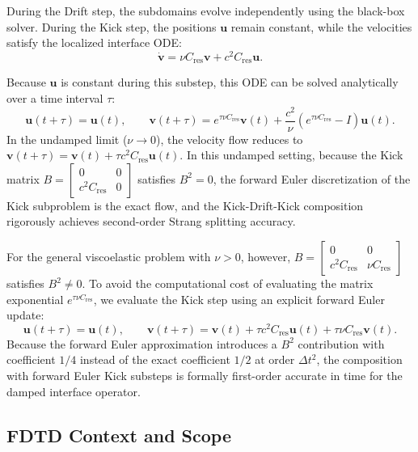 \documentclass{Configuration_Files/PoliMi3i_thesis}
\newif\ifshowthesischanges
\DeclareRobustCommand{\thesischange}[2]{%
    \ifshowthesischanges
        \textcolor{#1}{#2}%
    \else
        #2%
    \fi
}
\def\thesischange#1#2{#2}%
\begin{document}
During the Drift step, the subdomains evolve independently using the black-box solver. During the Kick step, the positions $\mathbf u$ remain constant, while the velocities satisfy the localized interface ODE:
\begin{equation*}
\mathbf{\dot v}
=
\nu C_{\mathrm{res}}\mathbf v
+
c^2C_{\mathrm{res}}\mathbf u.
\end{equation*}

\thesischange{red}{Because $\mathbf u$ is constant during this substep, this ODE can be solved analytically over a time interval $\tau$:
\begin{equation*}
\mathbf u(t+\tau) = \mathbf u(t),
\qquad
\mathbf v(t+\tau) = e^{\tau\nu C_{\mathrm{res}}}\mathbf v(t) + \frac{c^2}{\nu}\left(e^{\tau\nu C_{\mathrm{res}}} - I\right)\mathbf u(t).
\end{equation*}
In the undamped limit ($\nu \to 0$), the velocity flow reduces to $\mathbf v(t+\tau) = \mathbf v(t) + \tau c^2 C_{\mathrm{res}}\mathbf u(t)$. In this undamped setting, because the Kick matrix $B = \begin{bmatrix} 0 & 0 \\ c^2 C_{\mathrm{res}} & 0 \end{bmatrix}$ satisfies $B^2 = 0$, the forward Euler discretization of the Kick subproblem is the exact flow, and the Kick-Drift-Kick composition rigorously achieves second-order Strang splitting accuracy.}

\thesischange{red}{For the general viscoelastic problem with $\nu > 0$, however, $B = \begin{bmatrix} 0 & 0 \\ c^2 C_{\mathrm{res}} & \nu C_{\mathrm{res}} \end{bmatrix}$ satisfies $B^2 \neq 0$. To avoid the computational cost of evaluating the matrix exponential $e^{\tau\nu C_{\mathrm{res}}}$, we evaluate the Kick step using an explicit forward Euler update:
\begin{equation}
\mathbf u(t+\tau)=\mathbf u(t),
\qquad
\mathbf v(t+\tau)
=
\mathbf v(t)
+
\tau c^2C_{\mathrm{res}}\mathbf u(t)
+
\tau \nu C_{\mathrm{res}}\mathbf v(t).
\label{eq:kick_flow}
\end{equation}
Because the forward Euler approximation introduces a $B^2$ contribution with coefficient $1/4$ instead of the exact coefficient $1/2$ at order $\Delta t^2$, the composition with forward Euler Kick substeps is formally first-order accurate in time for the damped interface operator.}

\subsection{FDTD Context and Scope}
\end{document}
